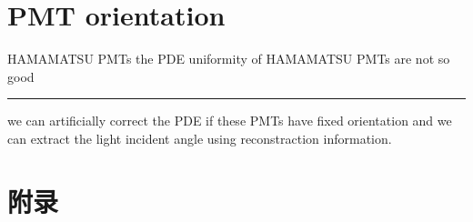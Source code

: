 \documentclass[11pt,compress,xcolor=x11names,UTF8]{beamer}
\begin{document}
\section{PMT orientation}
\begin{frame}{HAMAMATSU PMTs}
the PDE uniformity of HAMAMATSU PMTs are not so good
\hrule{\textwidth}
we can artificially correct the PDE if these PMTs have fixed orientation and we can extract the light incident angle using reconstraction information.
\end{frame}


\begin{frame}

\end{frame}


%
%

\appendix

\section*{附录}







\end{document}
